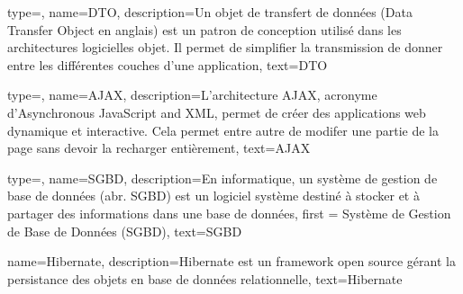 {
    type=\acronymtype,
    name={DTO},
    description={Un objet de transfert de données (Data Transfer Object en anglais) est un patron de conception utilisé dans les architectures logicielles objet. Il permet de simplifier la transmission de donner entre les différentes couches d'une application},
    text={DTO}
}

{
    type=\acronymtype,
    name={AJAX},
    description={L'architecture AJAX, acronyme d'Asynchronous JavaScript and XML, permet de créer des applications web dynamique et interactive\cite{wiki:AJAX}. Cela permet entre autre de modifer une partie de la page sans devoir la recharger entièrement},
    text={AJAX}
}

{
    type=\acronymtype,
    name={SGBD},
    description={En informatique, un système de gestion de base de données (abr. SGBD) est un logiciel système destiné à stocker et à partager des informations dans une base de données\cite{wiki:SGBD}},
    first = {Système de Gestion de Base de Données (SGBD)},
    text={SGBD}
}

{
    name={Hibernate},
    description={Hibernate est un framework open source gérant la persistance des objets en base de données relationnelle\cite{wiki:hibernate}},
    text={Hibernate}
}